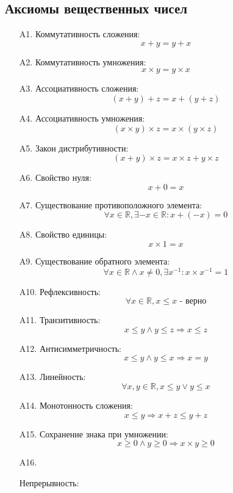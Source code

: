 \documentclass[class=article,a4paper,12pt,crop=false]{standalone}
\begin{document}
  \subsection{Аксиомы вещественных чисел}

  \begin{enumerate}
    \item[A1.] {
      Коммутативность сложения:
      \[x + y = y + x\]
    }
    \item[A2.] {
      Коммутативность умножения:
      \[x \times y = y \times x\]
    }
    \item[A3.] {
      Ассоциативность сложения:
      \[\left(x + y \right) + z = x + \left(y + z\right)\]
    }
    \item[A4.] {
      Ассоциативность умножения:
      \[\left(x \times y \right) \times z = x \times \left(y \times z\right)\]
    }
    \item[A5.] {
      Закон дистрибутивности:
      \[\left(x + y\right) \times z = x \times z + y \times z\]
    }
    \item[A6.] {
      Свойство нуля:
      \[x + 0 = x\]
    }
    \item[A7.] {
      Существование противоположного элемента:
      \[\forall x \in \mathbb{R}, \exists {-x} \in \mathbb{R}: x + \left(-x\right) = 0\]
    }
    \item[A8.] {
      Свойство единицы:
      \[x \times 1 = x\]
    }
    \item[A9.] {
      Существование обратного элемента:
      \[\forall x \in \mathbb{R} \land x \neq 0, \exists x^{-1}: x\times{x^{-1}} = 1 \]
    }
    \item[A10.] {
      Рефлексивность:
      \[\forall x \in \mathbb{R}, x \leq x \text{ - верно}\]
    }
    \item[A11.] {
      Транзитивность:
      \[x \leq y \land y \leq z \Rightarrow x \leq z\]
    }
    \item[A12.] {
      Антисимметричность:
      \[x \leq y \land y \leq x \Rightarrow x = y\]
    }
    \item[A13.] {
      Линейность:
      \[\forall x,y \in \mathbb{R}, x\leq y \lor y \leq x\]
    }
    \item[A14.] {
      Монотонность сложения:
      \[x \leq y \Rightarrow x + z \leq y + z\]
    }
    \item[A15.] {
      Сохранение знака при умножении:
      \[x \geq 0 \land y \geq 0 \Rightarrow x \times y \geq 0\]
    }
    \item[A16.] {
      Непрерывность:
      
}
\end{enumerate}
\end{document}
